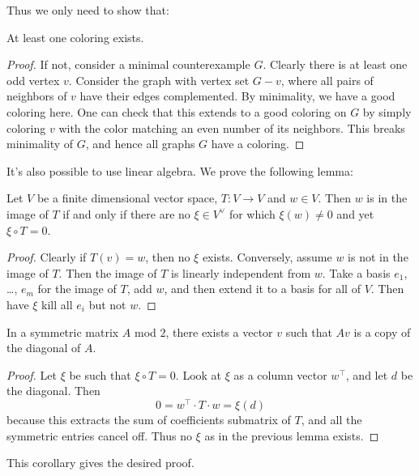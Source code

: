 \documentclass[11pt]{scrartcl}
\begin{document}
Thus we only need to show that:
\begin{claim*}
  At least one coloring exists.
\end{claim*}
\begin{proof}
If not, consider a minimal counterexample $G$.
Clearly there is at least one odd vertex $v$.
Consider the graph with vertex set $G-v$,
where all pairs of neighbors of $v$ have their edges complemented.
By minimality, we have a good coloring here.
One can check that this extends to a good coloring on $G$
by simply coloring $v$ with the color matching an even number of its neighbors.
This breaks minimality of $G$, and hence all graphs $G$ have a coloring.
\end{proof}

It's also possible to use linear algebra.
We prove the following lemma:
\begin{lemma*}[grobber]
Let $V$ be a finite dimensional vector space,
$T \colon V \to V$ and $w \in V$.
Then $w$ is in the image of $T$ if and only if
there are no $\xi \in V^\vee$ for which $\xi(w) \neq 0$
and yet $\xi \circ T = 0$.
\end{lemma*}

\begin{proof}
Clearly if $T(v) = w$, then no $\xi$ exists.
Conversely, assume $w$ is not in the image of $T$.
Then the image of $T$ is linearly independent from $w$.
Take a basis $e_1$, \dots, $e_m$ for the image of $T$, add $w$,
and then extend it to a basis for all of $V$.
Then have $\xi$ kill all $e_i$ but not $w$.
\end{proof}

\begin{corollary*}
  In a symmetric matrix $A$ mod $2$,
  there exists a vector $v$ such that $Av$ is a copy of the diagonal of $A$.
\end{corollary*}
\begin{proof}
  Let $\xi$ be such that $\xi \circ T = 0$.
  Look at $\xi$ as a column vector $w^\top$, and let $d$ be the diagonal.
  Then \[ 0 = w^\top \cdot T \cdot w = \xi(d) \]
  because this extracts the sum of coefficients submatrix of $T$,
  and all the symmetric entries cancel off.
  Thus no $\xi$ as in the previous lemma exists.
\end{proof}
This corollary gives the desired proof.
\pagebreak
\end{document}
